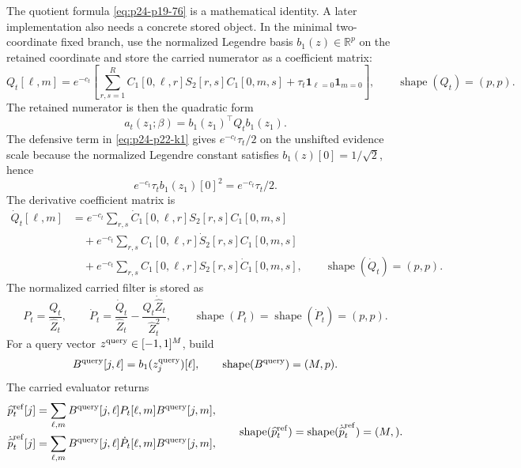 \documentclass[11pt]{article}
\numberwithin{equation}{section}
\newcommand{\R}{\mathbb R}
\newcommand{\ind}{\mathbf 1}
\newcommand{\shape}{\operatorname{shape}}
\begin{document}
The quotient formula \eqref{eq:p24-p19-76} is a mathematical identity.  A later implementation
also needs a concrete stored object.  In the minimal two-coordinate fixed
branch, use the normalized Legendre basis \(b_1(z)\in\R^p\) on the retained
coordinate and store the carried numerator as a coefficient matrix:
\begin{equation}
    Q_t[\ell,m]
    =
    e^{-c_t}\left[
    \sum_{r,s=1}^{R}
    C_1[0,\ell,r]S_2[r,s]C_1[0,m,s]
    +\tau_t\ind_{\ell=0}\ind_{m=0}
    \right],
    \qquad
    \shape(Q_t)=(p,p).
    \label{eq:p24-p22-k1}
\end{equation}
The retained numerator is then the quadratic form
\begin{equation}
    a_t(z_1;\beta)=b_1(z_1)^\top Q_t b_1(z_1).
    \label{eq:p24-p22-k2}
\end{equation}
The defensive term in \eqref{eq:p24-p22-k1} gives
\(e^{-c_t}\tau_t/2\) on the unshifted evidence scale because the normalized
Legendre constant satisfies \(b_1(z)[0]=1/\sqrt2\), hence
\begin{equation}
    e^{-c_t}\tau_t b_1(z_1)[0]^2=e^{-c_t}\tau_t/2.
    \label{eq:p24-p22-k3}
\end{equation}
The derivative coefficient matrix is
\begin{equation}
\begin{aligned}
    \dot Q_t[\ell,m]
    &=
    e^{-c_t}\sum_{r,s}
    \dot C_1[0,\ell,r]S_2[r,s]C_1[0,m,s]\\
    &\quad+
    e^{-c_t}\sum_{r,s}
    C_1[0,\ell,r]\dot S_2[r,s]C_1[0,m,s]\\
    &\quad+
    e^{-c_t}\sum_{r,s}
    C_1[0,\ell,r]S_2[r,s]\dot C_1[0,m,s],
    \qquad
    \shape(\dot Q_t)=(p,p).
\end{aligned}
\label{eq:p24-p22-k4}
\end{equation}
The normalized carried filter is stored as
\begin{equation}
    P_t=\frac{Q_t}{\widehat Z_t},
    \qquad
    \dot P_t=
    \frac{\dot Q_t}{\widehat Z_t}
    -
    \frac{Q_t\dot{\widehat Z}_t}{\widehat Z_t^2},
    \qquad
    \shape(P_t)=\shape(\dot P_t)=(p,p).
    \label{eq:p24-p22-k5}
\end{equation}
For a query vector \(z^{\rm query}\in[-1,1]^M\), build
\begin{equation}
    B^{\rm query}[j,\ell]=b_1(z^{\rm query}_j)[\ell],
    \qquad
    \shape(B^{\rm query})=(M,p).
    \label{eq:p24-p22-k6}
\end{equation}
The carried evaluator returns
\begin{equation}
\begin{aligned}
    \widehat p_t^{\rm ref}[j]
    &=
    \sum_{\ell,m}
    B^{\rm query}[j,\ell]P_t[\ell,m]B^{\rm query}[j,m],\\
    \dot{\widehat p}_t^{\rm ref}[j]
    &=
    \sum_{\ell,m}
    B^{\rm query}[j,\ell]\dot P_t[\ell,m]B^{\rm query}[j,m],
\end{aligned}
\qquad
\shape(\widehat p_t^{\rm ref})
=
\shape(\dot{\widehat p}_t^{\rm ref})
=(M,).
\label{eq:p24-p22-k7}
\end{equation}
\end{document}
